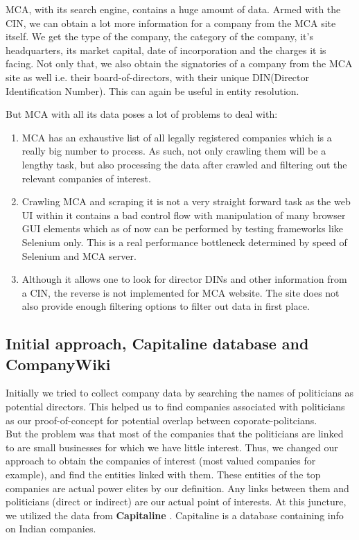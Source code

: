 MCA, with its search engine, contains a huge amount of data. Armed with the CIN, we can obtain a lot more information for a company from the MCA site itself. We get the type of the company, the category of the company, it's headquarters, its market capital, date of incorporation and the charges it is facing. Not only that, we also obtain the signatories of a company from the MCA site as well i.e. their board-of-directors, with their unique DIN(Director Identification Number). This can again be useful in entity resolution. 

But MCA with all its data poses a lot of problems to deal with:

\begin{enumerate}
    
    \item MCA has an exhaustive list of all legally registered companies which is a really big number to process. As such, not only crawling  them will be a lengthy task, but also processing the data after crawled and filtering out the relevant companies of interest. 

    \item Crawling MCA and scraping it is not a very straight forward task as the web UI within it contains a bad control flow with  manipulation of many browser GUI elements which as of now can be performed by testing frameworks like Selenium only. This is a real performance bottleneck determined by speed of Selenium and MCA server. 

    \item Although it allows one to look for director DINs and other information from a CIN, the reverse is not implemented for MCA website. The site does not also provide enough filtering options to filter out data in first place.

\end{enumerate}

\subsection{Initial approach, Capitaline database and CompanyWiki}

Initially we tried to collect company data by searching the names of politicians as potential directors. This helped us to find companies associated with politicians as our proof-of-concept for potential overlap between coporate-politcians. \\

But the problem was that most of the companies that the politicians are linked to are small businesses for which we have little interest. Thus, we changed our approach to obtain the companies of interest (most valued companies for example), and find the entities linked with them. These entities of the top companies are actual power elites by our definition. Any links between them and politicians (direct or indirect) are our actual point of interests.
At this juncture, we utilized the data from \textbf{Capitaline} \cite{Capitaline}. Capitaline is a database containing info on Indian companies. 

